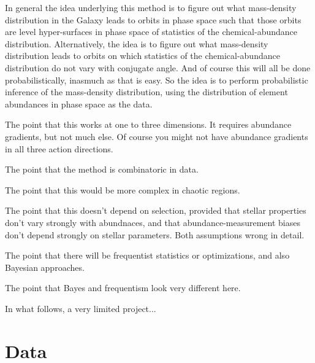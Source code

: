 \documentclass[modern]{aastex63}
\newcommand{\galah}{\acronym{GALAH}}
\newcommand{\hermes}{\acronym{HERMES}}
\begin{document}
In general the idea underlying this method is to figure out what mass-density distribution
in the Galaxy leads to orbits in phase space such that those orbits are level
hyper-surfaces in phase space of statistics of the chemical-abundance distribution.
Alternatively, the idea is to figure out what mass-density distribution leads to orbits
on which statistics of the chemical-abundance distribution do not vary with conjugate
angle.
And of course this will all be done probabilistically, inasmuch as that is easy.
So the idea is to perform probabilistic inference of the mass-density distribution, using
the distribution of element abundances in phase space as the data.

The point that this works at one to three dimensions. It requires abundance gradients, but
not much else. Of course you might not have abundance gradients in all three action directions.

The point that the method is combinatoric in data.

The point that this would be more complex in chaotic regions.

The point that this doesn't depend on selection, provided that stellar properties don't vary
strongly with abundnaces, and that abundance-measurement biases don't depend strongly on stellar
parameters. Both assumptions wrong in detail.

The point that there will be frequentist statistics or optimizations, and also Bayesian
approaches.

The point that Bayes and frequentism look very different here.

In what follows, a very limited project...

\section{Data}


\end{document}
